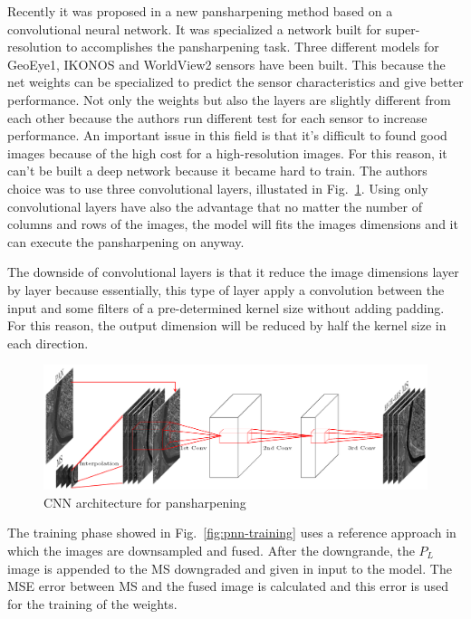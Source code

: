 \documentclass[12pt]{report}
\begin{document}
Recently it was proposed in \cite{pnn} a new pansharpening method based on a convolutional neural network.
It was specialized a network built for super-resolution \cite{superesolution} to accomplishes the 
pansharpening task.
Three different models for GeoEye1, IKONOS and WorldView2 sensors have been built. This because the net weights 
can be specialized to predict the sensor characteristics and give better performance. 
Not only the weights but also the layers are slightly different from each other because the authors run different 
test for each sensor to increase performance.
An important issue in this field is that it's difficult to found good images because of the high cost for a high-resolution images.
For this reason, it can't be built a deep network because it became hard to train. The authors choice was to use three convolutional layers, illustated in Fig.~\ref{fig:dl-pnn}. Using only convolutional layers have also the advantage that no matter the number of columns and rows
of the images, the model will fits the images dimensions and it can execute the pansharpening on anyway.

The downside of convolutional layers is that it reduce the image dimensions layer by layer because essentially, this type of layer
apply a convolution between the input and some filters of a pre-determined kernel size without adding padding. 
For this reason, the output dimension will be reduced by half the kernel size in each direction.

\begin{figure}[t]
    \centering
    \includegraphics[scale=.8]{dl-pnn.png}
    \caption{CNN architecture for pansharpening\cite{pnn}}
    \label{fig:dl-pnn}
\end{figure}

\newpage

The training phase showed in Fig.~\ref{fig:pnn-training} uses a reference approach in which the images are downsampled and fused. 
After the downgrande, the $P_L$ image is appended to the MS downgraded and given in input to the model.
The MSE error between MS and the fused image is calculated and this error is used for the training of the weights.
\end{document}
